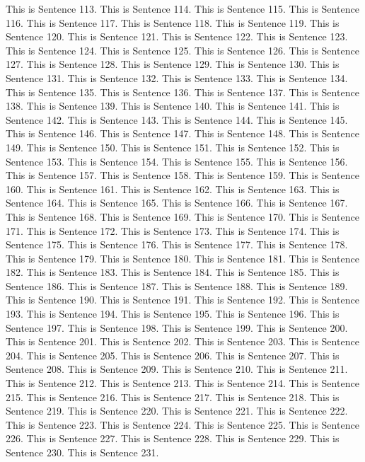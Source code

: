 \documentclass{article}
\begin{document}
This is Sentence 113.
This is Sentence 114.
This is Sentence 115.
This is Sentence 116.
This is Sentence 117.
This is Sentence 118.
This is Sentence 119.
This is Sentence 120.
This is Sentence 121.
This is Sentence 122.
This is Sentence 123.
This is Sentence 124.
This is Sentence 125.
This is Sentence 126.
This is Sentence 127.
This is Sentence 128.
This is Sentence 129.
This is Sentence 130.
This is Sentence 131.
This is Sentence 132.
This is Sentence 133.
This is Sentence 134.
This is Sentence 135.
This is Sentence 136.
This is Sentence 137.
This is Sentence 138.
This is Sentence 139.
This is Sentence 140.
This is Sentence 141.
This is Sentence 142.
This is Sentence 143.
This is Sentence 144.
This is Sentence 145.
This is Sentence 146.
This is Sentence 147.
This is Sentence 148.
This is Sentence 149.
This is Sentence 150.
This is Sentence 151.
This is Sentence 152.
This is Sentence 153.
This is Sentence 154.
This is Sentence 155.
This is Sentence 156.
This is Sentence 157.
This is Sentence 158.
This is Sentence 159.
This is Sentence 160.
This is Sentence 161.
This is Sentence 162.
This is Sentence 163.
This is Sentence 164.
This is Sentence 165.
This is Sentence 166.
This is Sentence 167.
This is Sentence 168.
This is Sentence 169.
This is Sentence 170.
This is Sentence 171.
This is Sentence 172.
This is Sentence 173.
This is Sentence 174.
This is Sentence 175.
This is Sentence 176.
This is Sentence 177.
This is Sentence 178.
This is Sentence 179.
This is Sentence 180.
This is Sentence 181.
This is Sentence 182.
This is Sentence 183.
This is Sentence 184.
This is Sentence 185.
This is Sentence 186.
This is Sentence 187.
This is Sentence 188.
This is Sentence 189.
This is Sentence 190.
This is Sentence 191.
This is Sentence 192.
This is Sentence 193.
This is Sentence 194.
This is Sentence 195.
This is Sentence 196.
This is Sentence 197.
This is Sentence 198.
This is Sentence 199.
This is Sentence 200.
This is Sentence 201.
This is Sentence 202.
This is Sentence 203.
This is Sentence 204.
This is Sentence 205.
This is Sentence 206.
This is Sentence 207.
This is Sentence 208.
This is Sentence 209.
This is Sentence 210.
This is Sentence 211.
This is Sentence 212.
This is Sentence 213.
This is Sentence 214.
This is Sentence 215.
This is Sentence 216.
This is Sentence 217.
This is Sentence 218.
This is Sentence 219.
This is Sentence 220.
This is Sentence 221.
This is Sentence 222.
This is Sentence 223.
This is Sentence 224.
This is Sentence 225.
This is Sentence 226.
This is Sentence 227.
This is Sentence 228.
This is Sentence 229.
This is Sentence 230.
This is Sentence 231.
\end{document}
